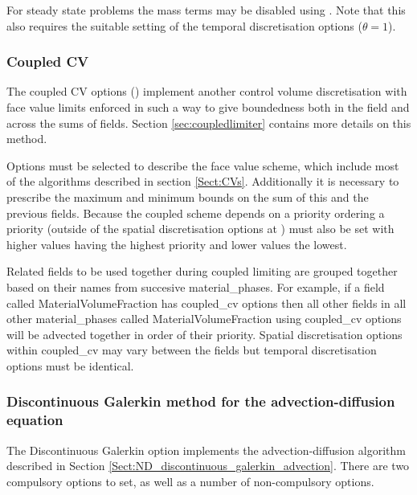 For steady state problems the mass terms may be disabled using .  Note that this also requires the suitable setting of the temporal discretisation options ($\theta=1$).

\subsubsection{Coupled CV}\label{Sect:CoupledCVs}

The coupled CV options () implement another control volume discretisation with face value limits enforced in such a way to give boundedness both in the field and across the sums of fields.  Section \ref{sec:coupledlimiter} contains more details on this method.

Options must be selected to describe the face value scheme, which include most of the algorithms described in section \ref{Sect:CVs}.  Additionally it is necessary to prescribe the maximum and minimum bounds on the sum of this and the previous fields.  Because the coupled scheme depends on a priority ordering a priority (outside of the spatial discretisation options at ) must also be set with higher values having the highest priority and lower values the lowest.

Related fields to be used together during coupled limiting are grouped together based on their names from succesive material\_phases.  For example, if a field called MaterialVolumeFraction has coupled\_cv options then all other fields in all other material\_phases called MaterialVolumeFraction using coupled\_cv options will be advected together in order of their priority.  Spatial discretisation options within coupled\_cv may vary between the fields but temporal discretisation options must be identical.

\subsubsection{Discontinuous Galerkin method for the
  advection-diffusion equation}

The Discontinuous Galerkin option implements the advection-diffusion
algorithm described in Section
\ref{Sect:ND_discontinuous_galerkin_advection}. There are two
compulsory options to set, as well as a number of non-compulsory options.

